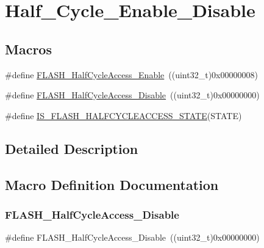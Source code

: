 \hypertarget{group___half___cycle___enable___disable}{}\section{Half\+\_\+\+Cycle\+\_\+\+Enable\+\_\+\+Disable}
\label{group___half___cycle___enable___disable}
\subsection*{Macros}
\begin{DoxyCompactItemize}
\item 
\#define \mbox{\hyperlink{group___half___cycle___enable___disable_ga95adf58ccf48094a9648085ac8d8af13}{F\+L\+A\+S\+H\+\_\+\+Half\+Cycle\+Access\+\_\+\+Enable}}~((uint32\+\_\+t)0x00000008)
\item 
\#define \mbox{\hyperlink{group___half___cycle___enable___disable_gad1ec816fa04b9a45e51c1cc9f1ba8f42}{F\+L\+A\+S\+H\+\_\+\+Half\+Cycle\+Access\+\_\+\+Disable}}~((uint32\+\_\+t)0x00000000)
\item 
\#define \mbox{\hyperlink{group___half___cycle___enable___disable_gad1b9e84a20436dcfe1a1ade4c26dc028}{I\+S\+\_\+\+F\+L\+A\+S\+H\+\_\+\+H\+A\+L\+F\+C\+Y\+C\+L\+E\+A\+C\+C\+E\+S\+S\+\_\+\+S\+T\+A\+TE}}(S\+T\+A\+TE)
\end{DoxyCompactItemize}


\subsection{Detailed Description}


\subsection{Macro Definition Documentation}
\mbox{\label{group___half___cycle___enable___disable_gad1ec816fa04b9a45e51c1cc9f1ba8f42}} 
\subsubsection{\texorpdfstring{FLASH\_HalfCycleAccess\_Disable}{FLASH\_HalfCycleAccess\_Disable}}
{\footnotesize\ttfamily \#define F\+L\+A\+S\+H\+\_\+\+Half\+Cycle\+Access\+\_\+\+Disable~((uint32\+\_\+t)0x00000000)}

